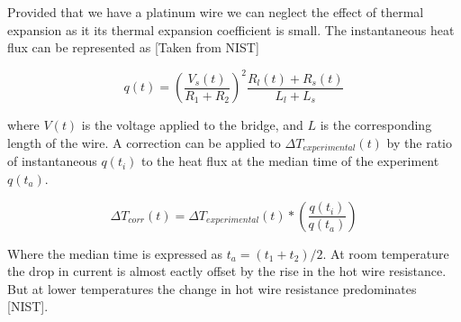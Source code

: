 \documentclass{article}
\begin{document}
Provided that we have a platinum wire we can neglect the effect of thermal expansion as it its thermal expansion coefficient is small. The instantaneous heat flux can be represented as [Taken from NIST]

$$ q(t) = \left( \frac{V_s(t)}{R_1 + R_2} \right) ^2 \frac{R_l(t) + R_s(t)}{L_l + L_s}$$

where $V(t)$ is the voltage applied to the bridge, and $L$ is the corresponding length of the wire.
A correction can be applied to $\Delta T_{experimental}(t)$ by the ratio of instantaneous $q(t_i)$ to the heat flux at the median time of the experiment $q(t_a)$.

$$\Delta T_{corr}(t) = \Delta T_{experimental}(t) * \left( \frac{q(t_i)}{q(t_a)} \right)$$

Where the median time is expressed as $t_a = (t_1 + t_2)/2$.
At room temperature the drop in current is almost eactly offset by the rise in the hot wire resistance. But at lower temperatures the change in hot wire resistance predominates [NIST].
\end{document}
